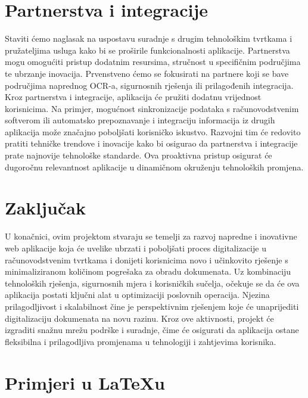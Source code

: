 		\section{Partnerstva i integracije}

		Staviti ćemo naglasak na uspostavu suradnje s drugim tehnološkim tvrtkama i pružateljima usluga kako bi se proširile funkcionalnosti aplikacije. Partnerstva mogu omogućiti pristup dodatnim resursima, stručnost u specifičnim područjima te ubrzanje inovacija.
		Prvenstveno ćemo se fokusirati na partnere koji se bave područjima naprednog OCR-a, sigurnosnih rješenja ili prilagođenih integracija. Kroz partnerstva i integracije, aplikacija će pružiti dodatnu vrijednost korisnicima. Na primjer, mogućnost sinkronizacije podataka s računovodstvenim softverom ili automatsko prepoznavanje i integraciju informacija iz drugih aplikacija može značajno poboljšati korisničko iskustvo.				 Razvojni tim će redovito pratiti tehničke trendove i inovacije kako bi osigurao da partnerstva i integracije prate najnovije tehnološke standarde. Ova proaktivna pristup osigurat će dugoročnu relevantnost aplikacije u dinamičnom okruženju tehnoloških promjena.
		
		\section{Zaključak}
		
		U konačnici, ovim projektom  stvaraju se temelji za razvoj napredne i inovativne web aplikacije koja će uvelike ubrzati i
		poboljšati proces digitalizacije u računovodstvenim tvrtkama i donijeti korisnicima novo i učinkovito rješenje s
		minimaliziranom količinom pogrešaka za obradu dokumenata. Uz kombinaciju tehnoloških rješenja, sigurnosnih mjera i korisničkih sučelja, očekuje se da će ova aplikacija postati ključni alat u optimizaciji poslovnih operacija. 
		Njezina prilagodljivost i skalabilnost čine je perspektivnim rješenjem koje će unaprijediti digitalizaciju dokumenata na novu razinu.
		Kroz ove aktivnosti, projekt će izgraditi snažnu mrežu podrške i suradnje, čime će osigurati da aplikacija ostane fleksibilna i prilagodljiva promjenama u tehnologiji i zahtjevima korisnika.
		\eject
		
		\section{Primjeri u \LaTeX u}
		
		\\

